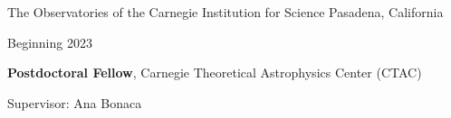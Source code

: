 \documentclass[cv.tex]{subfiles}
\begin{document}
{\color{themecolor} \large
The Observatories of the Carnegie Institution for Science
}
\hfill
Pasadena, California
\par\noindent
\parbox{0.18\textwidth}{%
	\raggedleft
	Beginning 2023 \par
	\null
}
\hspace{1mm}
\parbox{0.8\textwidth}{%
	\vspace{1mm}
	\textbf{Postdoctoral Fellow}, Carnegie Theoretical Astrophysics Center 
	(CTAC) \par
	Supervisor: Ana Bonaca
}
\end{document}
